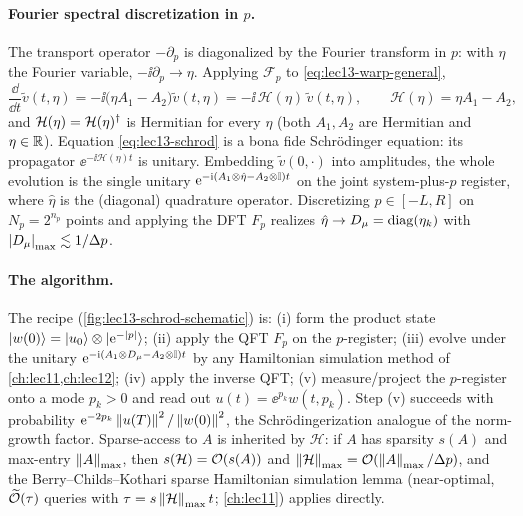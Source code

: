 \paragraph{Fourier spectral discretization in $p$.}
The transport operator $-\partial_p$ is diagonalized by the Fourier transform in $p$: with
$\eta$ the Fourier variable, $-\ii\partial_p\to\eta$. Applying $\mathcal F_p$ to
\eqref{eq:lec13-warp-general},
\begin{equation}
  \frac{\dd}{\dd t}\tilde v(t,\eta)=-\ii\bigl(\eta A_1-A_2\bigr)\tilde v(t,\eta)
  =-\ii\,\mathcal H(\eta)\,\tilde v(t,\eta),
  \qquad
  \mathcal H(\eta)=\eta A_1-A_2,
  \label{eq:lec13-schrod}
\end{equation}
and $\mathcal H(\eta)=\mathcal H(\eta)^{\dagger}$ is Hermitian for every $\eta$ (both $A_1,A_2$ are
Hermitian and $\eta\in\mathbb{R}$). Equation \eqref{eq:lec13-schrod} is a bona fide Schr\"odinger
equation: its propagator $\ee^{-\ii\mathcal H(\eta)t}$ is unitary. Embedding $\tilde v(0,\cdot)$
into amplitudes, the whole evolution is the single unitary $\mathrm{e}^{-\mathrm{i}(A_1\otimes\hat\eta-A_2
\otimes\mathbb{I})t}$ on the joint system-plus-$p$ register, where $\hat\eta$ is the (diagonal)
quadrature operator. Discretizing $p\in[-L,R]$ on $N_p=2^{n_p}$ points and applying the DFT
$F_p$ realizes $\hat\eta\to D_\mu=\operatorname{diag}(\eta_k)$ with $\left\lvert D_\mu \right\rvert_{\max}\lesssim1/\Delta p$.

\paragraph{The algorithm.}
The recipe (\cref{fig:lec13-schrod-schematic}) is: (i) form the product state
$\ket{w(0)}=\ket{u_0}\otimes\ket{\mathrm{e}^{-\left\lvert p \right\rvert}}$; (ii) apply the QFT $F_p$ on the $p$-register;
(iii) evolve under the unitary $\mathrm{e}^{-\mathrm{i}(A_1\otimes D_\mu-A_2\otimes\mathbb{I})t}$ by any Hamiltonian
simulation method of \cref{ch:lec11,ch:lec12}; (iv) apply the inverse QFT; (v) measure/project
the $p$-register onto a mode $p_k>0$ and read out $u(t)=\ee^{p_k}w(t,p_k)$. Step (v) succeeds
with probability $\mathrm{e}^{-2p_k}\left\lVert u(T) \right\rVert^2/\left\lVert w(0) \right\rVert^2$, the Schr\"odingerization analogue of
the norm-growth factor. Sparse-access to $A$ is inherited by $\mathcal H$: if $A$ has sparsity
$s(A)$ and max-entry $\left\lVert A \right\rVert_{\max}$, then $s(\mathcal H)=\mathcal{O}(s(A))$ and
$\left\lVert \mathcal H \right\rVert_{\max}=\mathcal{O}(\left\lVert A \right\rVert_{\max}/\Delta p)$, and the Berry--Childs--Kothari sparse
Hamiltonian simulation lemma (near-optimal, $\widetilde{\mathcal{O}}(\tau)$ queries with
$\tau=s\left\lVert \mathcal H \right\rVert_{\max}t$; \cref{ch:lec11}) applies directly.

